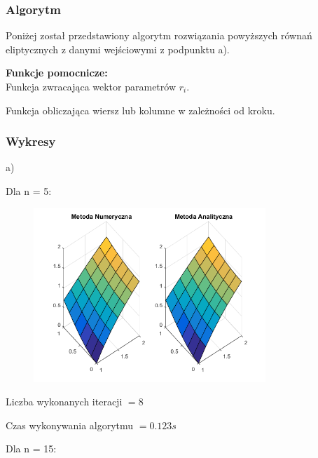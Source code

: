 \subsubsection{Algorytm}
Poniżej został przedstawiony algorytm rozwiązania powyższych równań eliptycznych z danymi wejściowymi z podpunktu a).

\newpage
\textbf{Funkcje pomocnicze:}\\

Funkcja zwracająca wektor parametrów $r_i$.



Funkcja obliczająca wiersz lub kolumne w zależności od kroku.


\newpage
\subsubsection{Wykresy}

a)

Dla n = 5:

\begin{figure}[!ht]
	\begin{center}
		\includegraphics[width=0.78\textwidth]{Lab6/charts/pr/zad1/5.png}
	\end{center}
\end{figure}

Liczba wykonanych iteracji $ = 8 $

Czas wykonywania algorytmu $ = 0.123 s$


Dla n = 15:

